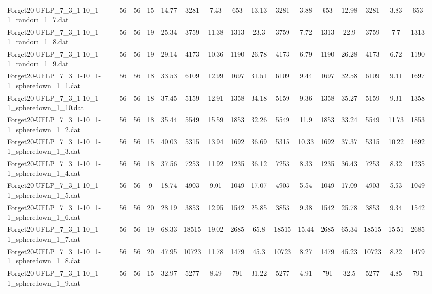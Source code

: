 \begin{sidewaystable}[!ht]
{\begin{tabular}{lccccccccccccccc}
Forget20-UFLP\_7\_3\_1-10\_1-1\_random\_1\_7.dat & 56 & 56 & 15 & 14.77 & 3281 & 7.43 & 653 & 13.13 & 3281 & 3.88 & 653 & 12.98 & 3281 & 3.83 & 653 \\
Forget20-UFLP\_7\_3\_1-10\_1-1\_random\_1\_8.dat & 56 & 56 & 19 & 25.34 & 3759 & 11.38 & 1313 & 23.3 & 3759 & 7.72 & 1313 & 22.9 & 3759 &  \textcolor{blue2}{7.7} & 1313 \\
Forget20-UFLP\_7\_3\_1-10\_1-1\_random\_1\_9.dat & 56 & 56 & 19 & 29.14 & 4173 & 10.36 & 1190 & 26.78 & 4173 & 6.79 & 1190 & 26.28 & 4173 & 6.72 & 1190 \\
Forget20-UFLP\_7\_3\_1-10\_1-1\_spheredown\_1\_1.dat & 56 & 56 & 18 & 33.53 & 6109 & 12.99 & 1697 & 31.51 & 6109 & 9.44 & 1697 & 32.58 & 6109 &  \textcolor{blue2}{9.41} & 1697 \\
Forget20-UFLP\_7\_3\_1-10\_1-1\_spheredown\_1\_10.dat & 56 & 56 & 18 & 37.45 & 5159 & 12.91 & 1358 & 34.18 & 5159 & 9.36 & 1358 & 35.27 & 5159 &  \textcolor{blue2}{9.31} & 1358 \\
Forget20-UFLP\_7\_3\_1-10\_1-1\_spheredown\_1\_2.dat & 56 & 56 & 18 & 35.44 & 5549 & 15.59 & 1853 & 32.26 & 5549 & 11.9 & 1853 & 33.24 & 5549 &  \textcolor{blue2}{11.73} & 1853 \\
Forget20-UFLP\_7\_3\_1-10\_1-1\_spheredown\_1\_3.dat & 56 & 56 & 15 & 40.03 & 5315 & 13.94 & 1692 & 36.69 & 5315 & 10.33 & 1692 & 37.37 & 5315 & 10.22 & 1692 \\
Forget20-UFLP\_7\_3\_1-10\_1-1\_spheredown\_1\_4.dat & 56 & 56 & 18 & 37.56 & 7253 & 11.92 & 1235 & 36.12 & 7253 & 8.33 & 1235 & 36.43 & 7253 & 8.32 & 1235 \\
Forget20-UFLP\_7\_3\_1-10\_1-1\_spheredown\_1\_5.dat & 56 & 56 & 9 & 18.74 & 4903 & 9.01 & 1049 & 17.07 & 4903 & 5.54 & 1049 & 17.09 & 4903 & 5.53 & 1049 \\
Forget20-UFLP\_7\_3\_1-10\_1-1\_spheredown\_1\_6.dat & 56 & 56 & 20 & 28.19 & 3853 & 12.95 & 1542 & 25.85 & 3853 & 9.38 & 1542 & 25.78 & 3853 & 9.34 & 1542 \\
Forget20-UFLP\_7\_3\_1-10\_1-1\_spheredown\_1\_7.dat & 56 & 56 & 19 & 68.33 & 18515 & 19.02 & 2685 & 65.8 & 18515 &  \textcolor{blue2}{15.44} & 2685 & 65.34 & 18515 & 15.51 & 2685 \\
Forget20-UFLP\_7\_3\_1-10\_1-1\_spheredown\_1\_8.dat & 56 & 56 & 20 & 47.95 & 10723 & 11.78 & 1479 & 45.3 & 10723 & 8.27 & 1479 & 45.23 & 10723 & 8.22 & 1479 \\
Forget20-UFLP\_7\_3\_1-10\_1-1\_spheredown\_1\_9.dat & 56 & 56 & 15 & 32.97 & 5277 & 8.49 & 791 & 31.22 & 5277 & 4.91 & 791 & 32.5 & 5277 & 4.85 & 791 \\

\end{tabular}}
\end{sidewaystable}
